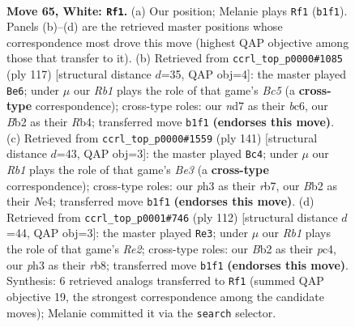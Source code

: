 \documentclass[11pt]{article}
\begin{document}
\clearpage

\begin{figure}[p]\centering
\begin{subfigure}{0.46\textwidth}\centering
\resizebox{\linewidth}{!}{%
\newchessgame
\chessboard[
  setfen={7k/3nr3/6P1/8/p1p5/P1P4p/1BP4P/1R5K w - - 19 65},
  showmover=false,
  pgfstyle=straightmove, color=movearrow, markmove={b1-f1}
]}
\caption{}
\end{subfigure}\hfill
\begin{subfigure}{0.46\textwidth}\centering
\resizebox{\linewidth}{!}{%
\newchessgame
\chessboard[
  setfen={6k1/6p1/p1B3P1/P5P1/1rb5/3pK3/5R2/8 b - - 4 59},
  showmover=false,
  pgfstyle=straightmove, color=movearrow, markmove={c4-e6}
]}
\caption{}
\end{subfigure}
\\[4pt]
\begin{subfigure}{0.46\textwidth}\centering
\resizebox{\linewidth}{!}{%
\newchessgame
\chessboard[
  setfen={6k1/1R6/4bp2/5p1p/4nP1P/B6P/2K5/8 b - - 12 71},
  showmover=false,
  pgfstyle=straightmove, color=movearrow, markmove={e6-c4}
]}
\caption{}
\end{subfigure}\hfill
\begin{subfigure}{0.46\textwidth}\centering
\resizebox{\linewidth}{!}{%
\newchessgame
\chessboard[
  setfen={1r6/8/8/5kpp/2p5/P5PP/K3RP2/8 w - - 17 57},
  showmover=false,
  pgfstyle=straightmove, color=movearrow, markmove={e2-e3}
]}
\caption{}
\end{subfigure}
\caption{\textbf{Move 65, White: \texttt{Rf1}.} (a) Our position; Melanie plays \texttt{Rf1} (\texttt{b1f1}). Panels (b)--(d) are the retrieved master positions whose correspondence most drove this move (highest QAP objective among those that transfer to it). (b) Retrieved from \texttt{ccrl\_top\_p0000\#1085} (ply 117) [structural distance $d$=35, QAP obj=4]: the master played \texttt{Be6}; under $\mu$ our \emph{Rb1} plays the role of that game's \emph{Bc5} (a \textbf{cross-type} correspondence); cross-type roles: our \emph{n}d7 as their \emph{b}c6, our \emph{B}b2 as their \emph{R}b4; transferred move \texttt{b1f1} \textbf{(endorses this move)}. (c) Retrieved from \texttt{ccrl\_top\_p0000\#1559} (ply 141) [structural distance $d$=43, QAP obj=3]: the master played \texttt{Bc4}; under $\mu$ our \emph{Rb1} plays the role of that game's \emph{Be3} (a \textbf{cross-type} correspondence); cross-type roles: our \emph{p}h3 as their \emph{r}b7, our \emph{B}b2 as their \emph{N}e4; transferred move \texttt{b1f1} \textbf{(endorses this move)}. (d) Retrieved from \texttt{ccrl\_top\_p0001\#746} (ply 112) [structural distance $d$=44, QAP obj=3]: the master played \texttt{Re3}; under $\mu$ our \emph{Rb1} plays the role of that game's \emph{Re2}; cross-type roles: our \emph{B}b2 as their \emph{p}c4, our \emph{p}h3 as their \emph{r}b8; transferred move \texttt{b1f1} \textbf{(endorses this move)}. Synthesis: 6 retrieved analogs transferred to \texttt{Rf1} (summed QAP objective 19, the strongest correspondence among the candidate moves); Melanie committed it via the \texttt{search} selector.}
\label{fig:thought-m128}
\end{figure}
\end{document}
